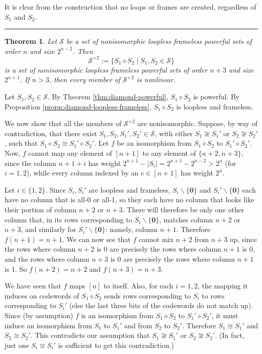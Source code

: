 \documentclass[12pt]{article}
\newtheorem{thm}{Theorem}[section]
\def\pf{\noindent {\it Proof.\ }}
\def\qed{\hfill \rule{4pt}{7pt}}
\begin{document}
\pf It is clear from the construction that no loops or frames are created, regardless of $S_1$ and $S_2$.\qed


\begin{thm}
\label{thm:diamond-enum}
Let $\mathcal{S}$ be a set of nonisomorphic loopless frameless powerful sets of order $n$
and size $2^{n-2}$.  Then
\[
\mathcal{S}^{\diamond2} := \{ S_1 \diamond S_2 \mid S_1,S_2\in\mathcal{S} \}
\]
is a set of nonisomorphic loopless frameless powerful sets of order $n+3$ and size $2^{n+1}$.
If $n>3$, then every member of $\mathcal{S}^{\diamond2}$ is nonlinear.
\end{thm}

\pf Let $S_1,S_2\in\mathcal{S}$.  By Theorem \ref{thm:diamond-powerful}, $S_1 \diamond S_2$ is powerful.
By Proposition \ref{propn:diamond-loopless-frameless}, $S_1 \diamond S_2$ is loopless and frameless.

We now show that all the members of $\mathcal{S}^{\diamond2}$ are nonisomorphic.
Suppose, by way of contradiction, that there exist $S_1,S_2,S_1',S_2'\in\mathcal{S}$, with
either $S_1\not\cong S_1'$ or $S_2\not\cong S_2'$, such that
$S_1 \diamond S_2\cong S_1' \diamond S_2'$.
Let $f$ be an isomorphism from $S_1 \diamond S_2$ to $S_1' \diamond S_2'$.
Now, $f$ cannot map any element of $[n+1]$ to any element of $\{n+2,n+3\}$, since
the column $n+1+i$ has weight $2^{n+1}-|S_i|=2^{n+1}-2^{n-2}>2^n$ (for $i=1,2$),
while every column indexed by an $e\in[n+1]$ has weight $2^n$.

Let $i\in\{1,2\}$.  Since $S_i,S_i'$ are loopless and frameless,
$S_i\backslash\{\mathbf{0}\}$ and $S_i'\backslash\{\mathbf{0}\}$ each have no column
that is all-0 or all-1,
so they each have no column that looks like their portion of column $n+2$ or $n+3$.
There will therefore be only one other column that, in its rows corresponding to
$S_i\backslash\{\mathbf{0}\}$, matches column $n+2$ or $n+3$, and similarly for
$S_i'\backslash\{\mathbf{0}\}$: namely, column $n+1$.  Therefore $f(n+1)=n+1$.
We can now see that $f$ cannot mix $n+2$ from $n+3$ up, since the rows where
column $n+2$ is 0 are precisely the rows where column $n+1$ is 0, and the rows
where column $n+3$ is 0 are precisely the rows where column $n+1$ is 1.
So $f(n+2)=n+2$ and $f(n+3)=n+3$.

We have seen that $f$ maps $[n]$ to itself.  Also, for each $i=1,2$,
the mapping it induces on codewords of $S_1 \diamond S_2$
sends rows corresponding to $S_i$ to rows corresponding to $S_i'$ (else the last three
bits of the codewords do not match up).  Since (by assumption) $f$ is an isomorphism
from $S_1 \diamond S_2$ to $S_1' \diamond S_2'$, it must induce an isomorphism from
$S_1$ to $S_1'$ and from $S_2$ to $S_2'$.
Therefore $S_1\cong S_1'$ and $S_2\cong S_2'$.
This contradicts our assumption that $S_1\not\cong S_1'$ or $S_2\not\cong S_2'$.
(In fact, just one $S_i\cong S_i'$ is sufficient to get this contradiction.)
\end{document}

